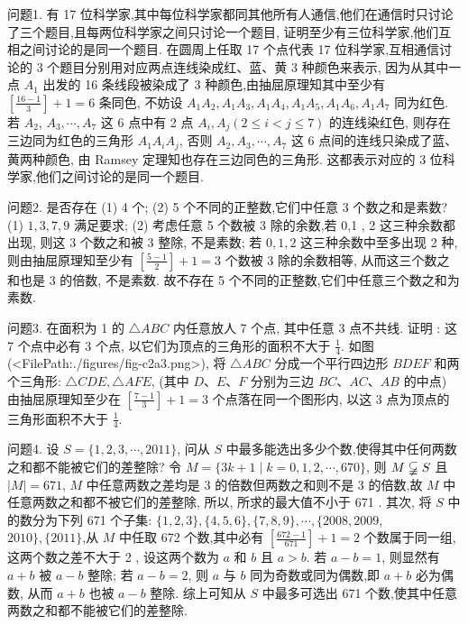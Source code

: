 
问题1. 有 17 位科学家,其中每位科学家都同其他所有人通信,他们在通信时只讨论了三个题目,且每两位科学家之间只讨论一个题目, 证明至少有三位科学家,他们互相之间讨论的是同一个题目.
在圆周上任取 17 个点代表 17 位科学家,互相通信讨论的 3 个题目分别用对应两点连线染成红、蓝、黄 3 种颜色来表示, 因为从其中一点 $A_1$ 出发的 16 条线段被染成了 3 种颜色,由抽屈原理知其中至少有 $\left[\frac{16-1}{3}\right]+1=6$ 条同色, 不妨设 $A_1 A_2, A_1 A_3, A_1 A_4, A_1 A_5, A_1 A_6, A_1 A_7$ 同为红色.
若 $A_2$, $A_3, \cdots, A_7$ 这 6 点中有 2 点 $A_i, A_j(2 \leqslant i<j \leqslant 7)$ 的连线染红色, 则存在三边同为红色的三角形 $A_1 A_i A_j$, 否则 $A_2, A_3, \cdots, A_7$ 这 6 点间的连线只染成了蓝、黄两种颜色, 由 Ramsey 定理知也存在三边同色的三角形.
这都表示对应的 3 位科学家,他们之间讨论的是同一个题目.



问题2. 是否存在 (1) 4 个; (2) 5 个不同的正整数,它们中任意 3 个数之和是素数? 
(1) $1,3,7,9$ 满足要求; (2) 考虑任意 5 个数被 3 除的余数,若 0,1 ,
2 这三种余数都出现, 则这 3 个数之和被 3 整除, 不是素数; 若 $0,1,2$ 这三种余数中至多出现 2 种, 则由抽屈原理知至少有 $\left[\frac{5-1}{2}\right]+1=3$ 个数被 3 除的余数相等, 从而这三个数之和也是 3 的倍数, 不是素数.
故不存在 5 个不同的正整数,它们中任意三个数之和为素数.



问题3. 在面积为 1 的 $\triangle A B C$ 内任意放人 7 个点, 其中任意 3 点不共线.
证明 : 这 7 个点中必有 3 个点, 以它们为顶点的三角形的面积不大于 $\frac{1}{4}$.
如图(<FilePath:./figures/fig-c2a3.png>), 将 $\triangle A B C$ 分成一个平行四边形 $B D E F$ 和两个三角形: $\triangle C D E, \triangle A F E$, (其中 $D 、 E 、 F$ 分别为三边 $B C 、 A C 、 A B$ 的中点) 由抽屈原理知至少在 $\left[\frac{7-1}{3}\right]+1=3$ 个点落在同一个图形内, 以这 3 点为顶点的三角形面积不大于 $\frac{1}{4}$.



问题4. 设 $S=\{1,2,3, \cdots, 2011\}$, 问从 $S$ 中最多能选出多少个数,使得其中任何两数之和都不能被它们的差整除?
令 $M=\{3 k+1 \mid k=0,1,2, \cdots, 670\}$, 则 $M \varsubsetneqq S$ 且 $|M|=671$, $M$ 中任意两数之差均是 3 的倍数但两数之和则不是 3 的倍数,故 $M$ 中任意两数之和都不被它们的差整除, 所以, 所求的最大值不小于 671 . 其次, 将 $S$ 中的数分为下列 671 个子集: $\{1,2,3\},\{4,5,6\},\{7,8,9\}, \cdots,\{2008,2009$, $2010\},\{2011\}$,从 $M$ 中任取 672 个数,其中必有 $\left[\frac{672-1}{671}\right]+1=2$ 个数属于同一组, 这两个数之差不大于 2 , 设这两个数为 $a$ 和 $b$ 且 $a>b$. 若 $a-b=1$, 则显然有 $a+b$ 被 $a-b$ 整除; 若 $a-b=2$, 则 $a$ 与 $b$ 同为奇数或同为偶数,即 $a+b$ 必为偶数, 从而 $a+b$ 也被 $a-b$ 整除.
综上可知从 $S$ 中最多可选出 671 个数,使其中任意两数之和都不能被它们的差整除.



